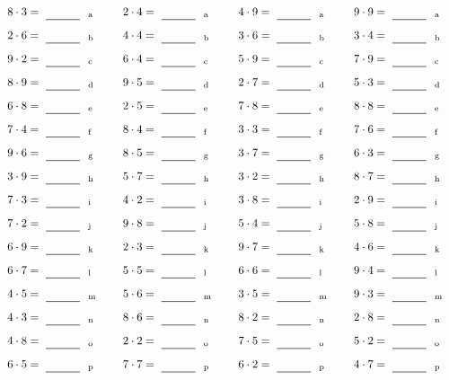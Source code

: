 \documentclass
[
  draft    = true,
  fontsize = 11pt,
  parskip  = half-
]
{scrartcl}
\begin{document}
\par\vfill\par
\begin{align*}
    \pline{8\cdot3}&=\rline{a}
  & \pline{2\cdot4}&=\rline{a}
  & \pline{4\cdot9}&=\rline{a}
  & \pline{9\cdot9}&=\rline{a} \\[1ex]
    \pline{2\cdot6}&=\rline{b}
  & \pline{4\cdot4}&=\rline{b}
  & \pline{3\cdot6}&=\rline{b}
  & \pline{3\cdot4}&=\rline{b} \\[1ex]
    \pline{9\cdot2}&=\rline{c}
  & \pline{6\cdot4}&=\rline{c}
  & \pline{5\cdot9}&=\rline{c}
  & \pline{7\cdot9}&=\rline{c} \\[1ex]
    \pline{8\cdot9}&=\rline{d}
  & \pline{9\cdot5}&=\rline{d}
  & \pline{2\cdot7}&=\rline{d}
  & \pline{5\cdot3}&=\rline{d} \\[1ex]
    \pline{6\cdot8}&=\rline{e}
  & \pline{2\cdot5}&=\rline{e}
  & \pline{7\cdot8}&=\rline{e}
  & \pline{8\cdot8}&=\rline{e} \\[1ex]
    \pline{7\cdot4}&=\rline{f}
  & \pline{8\cdot4}&=\rline{f}
  & \pline{3\cdot3}&=\rline{f}
  & \pline{7\cdot6}&=\rline{f} \\[1ex]
    \pline{9\cdot6}&=\rline{g}
  & \pline{8\cdot5}&=\rline{g}
  & \pline{3\cdot7}&=\rline{g}
  & \pline{6\cdot3}&=\rline{g} \\[1ex]
    \pline{3\cdot9}&=\rline{h}
  & \pline{5\cdot7}&=\rline{h}
  & \pline{3\cdot2}&=\rline{h}
  & \pline{8\cdot7}&=\rline{h} \\[1ex]
    \pline{7\cdot3}&=\rline{i}
  & \pline{4\cdot2}&=\rline{i}
  & \pline{3\cdot8}&=\rline{i}
  & \pline{2\cdot9}&=\rline{i} \\[1ex]
    \pline{7\cdot2}&=\rline{j}
  & \pline{9\cdot8}&=\rline{j}
  & \pline{5\cdot4}&=\rline{j}
  & \pline{5\cdot8}&=\rline{j} \\[1ex]
    \pline{6\cdot9}&=\rline{k}
  & \pline{2\cdot3}&=\rline{k}
  & \pline{9\cdot7}&=\rline{k}
  & \pline{4\cdot6}&=\rline{k} \\[1ex]
    \pline{6\cdot7}&=\rline{l}
  & \pline{5\cdot5}&=\rline{l}
  & \pline{6\cdot6}&=\rline{l}
  & \pline{9\cdot4}&=\rline{l} \\[1ex]
    \pline{4\cdot5}&=\rline{m}
  & \pline{5\cdot6}&=\rline{m}
  & \pline{3\cdot5}&=\rline{m}
  & \pline{9\cdot3}&=\rline{m} \\[1ex]
    \pline{4\cdot3}&=\rline{n}
  & \pline{8\cdot6}&=\rline{n}
  & \pline{8\cdot2}&=\rline{n}
  & \pline{2\cdot8}&=\rline{n} \\[1ex]
    \pline{4\cdot8}&=\rline{o}
  & \pline{2\cdot2}&=\rline{o}
  & \pline{7\cdot5}&=\rline{o}
  & \pline{5\cdot2}&=\rline{o} \\[1ex]
    \pline{6\cdot5}&=\rline{p}
  & \pline{7\cdot7}&=\rline{p}
  & \pline{6\cdot2}&=\rline{p}
  & \pline{4\cdot7}&=\rline{p}
\end{align*}
\end{document}
